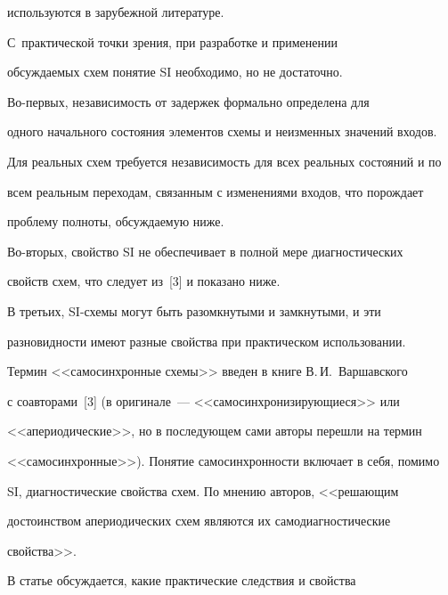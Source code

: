используются в зарубежной литературе.


      


      С~практической точки зрения, при разработке и применении 


обсуждаемых схем понятие SI необходимо, но не достаточно.


      


      Во-первых, независимость от задержек формально определена для 


одного начального состояния элементов схемы и неизменных значений входов. 


Для реальных схем требуется независимость для всех реальных состояний и по 


всем реальным переходам, связанным с изменениями входов, что порождает 


проблему полноты, обсуждаемую ниже.


      


      Во-вторых, свойство SI не обеспечивает в полной мере диагностических 


свойств схем, что следует из~[3] и показано ниже.


      


      В третьих, SI-схемы могут быть разомкнутыми и замкнутыми, и эти 


разновидности имеют разные свойства при практическом использовании.


      


      Термин <<самосинхронные схемы>> введен в книге В.\,И.~Варшавского 


с соавторами~[3] (в оригинале~--- <<самосинхронизирующиеся>> или 


<<апериодические>>, но в последующем сами авторы перешли на термин 


<<самосинхронные>>). Понятие самосинхронности включает в себя, помимо 


SI, диагностические свойства схем. По мнению авторов, <<решающим 


достоинством апериодических схем являются их самодиагностические 


свойства>>.


      


      В статье обсуждается, какие практические следствия и свойства 


